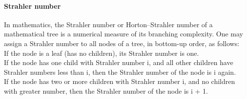 \paragraph{Strahler number} In mathematics, the Strahler number or Horton–Strahler number of a mathematical tree is a numerical measure of its branching complexity. One may assign a Strahler number to all nodes of a tree, in bottom-up order, as follows:\\
If the node is a leaf (has no children), its Strahler number is one.\\
If the node has one child with Strahler number i, and all other children have Strahler numbers less than i, then the Strahler number of the node is i again.\\
If the node has two or more children with Strahler number i, and no children with greater number, then the Strahler number of the node is i + 1.

